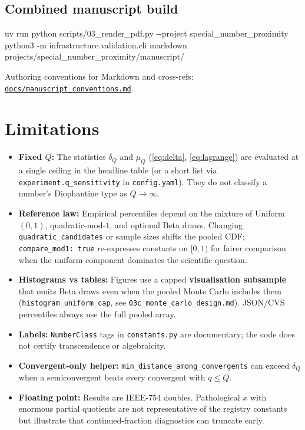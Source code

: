 \documentclass[
]{article}
\newenvironment{Shaded}{}{}
\newcommand{\AttributeTok}[1]{\textcolor[rgb]{0.49,0.56,0.16}{#1}}
\newcommand{\ExtensionTok}[1]{#1}
\newcommand{\NormalTok}[1]{#1}
\begin{document}
\subsection{Combined manuscript build}\label{combined-manuscript-build}

\begin{Shaded}
\begin{Highlighting}[]
\ExtensionTok{uv}\NormalTok{ run python scripts/03\_render\_pdf.py }\AttributeTok{{-}{-}project}\NormalTok{ special\_number\_proximity}
\ExtensionTok{python3} \AttributeTok{{-}m}\NormalTok{ infrastructure.validation.cli markdown projects/special\_number\_proximity/manuscript/}
\end{Highlighting}
\end{Shaded}

Authoring conventions for Markdown and cross-refs:
\href{../docs/manuscript_conventions.md}{\texttt{docs/manuscript\_conventions.md}}.

\newpage

\section{Limitations}\label{limitations}

\begin{itemize}
\item
  \textbf{Fixed \(Q\):} The statistics \(\delta_Q\) and \(\mu_Q\)
  (\eqref{eq:delta}, \eqref{eq:lagrange}) are evaluated at a single
  ceiling in the headline table (or a short list via
  \texttt{experiment.q\_sensitivity} in \texttt{config.yaml}). They do
  not classify a number's Diophantine type as \(Q \to \infty\).
\item
  \textbf{Reference law:} Empirical percentiles depend on the mixture of
  Uniform\((0,1)\), quadratic-mod-\(1\), and optional Beta draws.
  Changing \texttt{quadratic\_candidates} or sample sizes shifts the
  pooled CDF; \texttt{compare\_mod1:\ true} re-expresses constants on
  \([0,1)\) for fairer comparison when the uniform component dominates
  the scientific question.
\item
  \textbf{Histograms vs tables:} Figures use a capped
  \textbf{visualisation subsample} that omits Beta draws even when the
  pooled Monte Carlo includes them (\texttt{histogram\_uniform\_cap},
  see \texttt{03c\_monte\_carlo\_design.md}). JSON/CVS percentiles
  always use the full pooled array.
\item
  \textbf{Labels:} \texttt{NumberClass} tags in \texttt{constants.py}
  are documentary; the code does not certify transcendence or
  algebraicity.
\item
  \textbf{Convergent-only helper:}
  \texttt{min\_distance\_among\_convergents} can exceed \(\delta_Q\)
  when a semiconvergent beats every convergent with \(q \leq Q\).
\item
  \textbf{Floating point:} Results are IEEE-754 doubles. Pathological
  \(x\) with enormous partial quotients are not representative of the
  registry constants but illustrate that continued-fraction diagnostics
  can truncate early.
\end{itemize}
\end{document}
